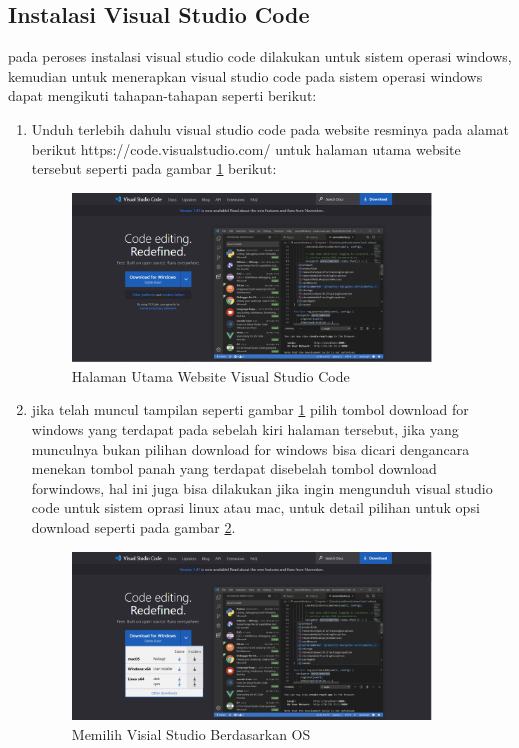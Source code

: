 \subsection{Instalasi Visual Studio Code}
	pada peroses instalasi visual studio code dilakukan untuk sistem operasi windows, kemudian untuk menerapkan visual studio code pada sistem operasi windows dapat mengikuti tahapan-tahapan seperti berikut:
\begin{enumerate}
\item Unduh terlebih dahulu visual studio code pada website resminya pada alamat berikut https://code.visualstudio.com/ untuk halaman utama website tersebut seperti pada gambar \ref{V1} berikut:\par
 \begin{figure}[!htbp]
	\centerline{\includegraphics[width=0.90\textwidth]{figures/vs/1.png}}
	\caption{Halaman Utama Website Visual Studio Code}
	\label{V1}
\end{figure}
\item jika telah muncul tampilan seperti gambar \ref{V1} pilih tombol download for windows yang terdapat pada sebelah kiri halaman tersebut, jika yang munculnya bukan pilihan download for windows bisa dicari dengancara menekan tombol panah yang terdapat disebelah tombol download forwindows, hal ini juga bisa dilakukan jika ingin mengunduh visual studio code untuk sistem oprasi linux atau mac, untuk detail pilihan untuk opsi download seperti pada gambar \ref{V2}.\par

\begin{figure}[!htbp]
	\centerline{\includegraphics[width=0.9\textwidth]{figures/vs/2.png}}
	\caption{Memilih Visial Studio Berdasarkan OS}
	\label{V2}
\end{figure}
 

\end{enumerate}
